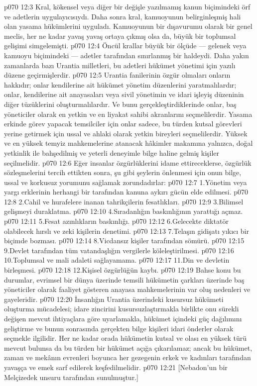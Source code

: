 \vs p070 12:3 Kral, kökensel veya diğer bir değişle yazılmamış kanun biçimindeki örf ve adetlerin uygulayıcısıydı. Daha sonra kral, kamuoyunun belirginleşmiş hali olan yasama hükümlerini uyguladı. Kamuoyunun bir dışavurumu olarak bir genel meclis, her ne kadar yavaş yavaş ortaya çıkmış olsa da, büyük bir toplumsal gelişimi simgelemişti.
\vs p070 12:4 Öncül krallar büyük bir ölçüde --- gelenek veya kamuoyu biçimindeki --- adetler tarafından sınırlanmış bir haldeydi. Daha yakın zamanlarda bazı Urantia milletleri, bu adetleri hükümet yönetimi için yazılı düzene geçirmişlerdir.
\vs p070 12:5 Urantia fanilerinin özgür olmaları onların hakkıdır; onlar kendilerine ait hükümet yönetim düzenlerini yaratmalılardır; onlar, kendilerine ait anayasaları veya sivil yönetimin ve idari işleyiş düzeninin diğer tüzüklerini oluşturmalılardır. Ve bunu gerçekleştirdiklerinde onlar, baş yöneticiler olarak en yetkin ve en liyakat sahibi akranlarını seçmelilerdir. Yasama erkinde görev yapacak temsilciler için onlar sadece, bu türden kutsal görevleri yerine getirmek için ussal ve ahlaki olarak yetkin bireyleri seçmelilerdir. Yüksek ve en yüksek temyiz mahkemelerine atanacak hâkimler makamına yalnızca, doğal yetkinlik ile bahşedilmiş ve yeterli deneyimle bilge haline gelmiş kişiler seçilmelidir.
\vs p070 12:6 Eğer insanlar özgürlüklerini idame ettireceklerse, özgürlük sözleşmelerini tercih ettikten sonra, şu gibi şeylerin önlenmesi için onun bilge, ussal ve korkusuz yorumunu sağlamak zorundadırlar:
\vs p070 12:7 1.\bibnobreakspace Yönetim veya yargı erklerinin herhangi bir tarafından kanuna aykırı gücün elde edilmesi.
\vs p070 12:8 2.\bibnobreakspace Cahil ve hurafelere inanan tahrikçilerin fesatlıkları.
\vs p070 12:9 3.\bibnobreakspace Bilimsel gelişmeyi duraklatma.
\vs p070 12:10 4.\bibnobreakspace Sıradanlığın baskınlığının yarattığı açmaz.
\vs p070 12:11 5.\bibnobreakspace Fesat azınlıkların baskınlığı.
\vs p070 12:12 6.\bibnobreakspace Gelecekte diktatör olabilecek hırslı ve zeki kişilerin denetimi.
\vs p070 12:13 7.\bibnobreakspace Telaşın gidişatı yıkıcı bir biçimde bozması.
\vs p070 12:14 8.\bibnobreakspace Vicdansız kişiler tarafından sömürü.
\vs p070 12:15 9.\bibnobreakspace Devlet tarafından tüm vatandaşlığın vergilerle köleleştirilmesi.
\vs p070 12:16 10.\bibnobreakspace Toplumsal ve mali adaleti sağlayamama.
\vs p070 12:17 11.\bibnobreakspace Din ve devletin birleşmesi.
\vs p070 12:18 12.\bibnobreakspace Kişisel özgürlüğün kaybı.
\vs p070 12:19 Bahse konu bu durumlar, evrimsel bir dünya üzerinde temsili hükümetin çarkları üzerinde baş yöneticiler olarak faaliyet gösteren anayasa mahkemelerinin var oluş nedenleri ve gayeleridir.
\vs p070 12:20 İnsanlığın Urantia üzerindeki kusursuz hükümeti oluşturma mücadelesi; idare zincirini kusursuzlaştırmakla birlikte onu sürekli değişen mevcut ihtiyaçlara göre uyarlamakla, hükümet içindeki güç dağılımını geliştirme ve bunun sonrasında gerçekten bilge kişileri idari önderler olarak seçmekle ilgilidir. Her ne kadar orada hükümetin kutsal ve olası en yüksek türü mevcut bulunsa da bu türden bir hükümet açığa çıkarılamaz; ancak bu hükümet, zaman ve mekânın evrenleri boyunca her gezegenin erkek ve kadınları tarafından yavaşça ve emek sarf edilerek keşfedilmelidir.
\vs p070 12:21 [Nebadon’un bir Melçizedek unsuru tarafından sunulmuştur.]
